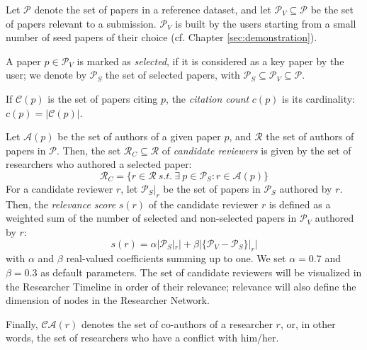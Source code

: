 Let $\mathcal{P}$ denote the set of papers in a reference dataset, %
and let $\mathcal{P}_{V} \subseteq \mathcal{P}$ be the set of papers relevant to a submission. %
$\mathcal{P}_{V}$ is built by the users starting from a small number of seed papers of their choice (cf. Chapter \ref{sec:demonstration}).%

A paper $p \in \mathcal{P}_{V}$ is marked as \emph{selected}, if it is considered as a key paper by the user; we denote by $\mathcal{P}_{S}$ the set of selected papers, with $\mathcal{P}_{S} \subseteq \mathcal{P}_{V} \subseteq \mathcal{P}$. 

If $\mathcal{C}(p)$ is the set of papers citing $p$, the \emph{citation count} $c(p)$ is its cardinality: $c(p) = \vert \mathcal{C}(p) \vert$.

Let $\mathcal{A}(p)$ be the set of authors of a given paper $p$, and $\mathcal{R}$ the set of authors of papers in $\mathcal{P}$. 
Then, the set $\mathcal{R}_C \subseteq \mathcal{R}$ of \emph{candidate reviewers} is given by the set of researchers who authored a selected paper: $$\mathcal{R}_{C} = \{r \in \mathcal{R} \ s.t. \ \exists \ p \in \mathcal{P}_S : r \in \mathcal{A}(p)\}$$ %
%
For a candidate reviewer $r$, let $\mathcal{P}_{S}|_{r}$ be the set of papers in $\mathcal{P}_{S}$ authored by $r$. Then, the \emph{relevance score} $s(r)$ of the candidate reviewer $r$ is defined as a weighted sum of the number of selected and non-selected papers in $\mathcal{P}_V$ authored by $r$: $$s(r) = \alpha \vert \mathcal{P}_{S}|_{r} \vert + \beta \vert \{\mathcal{P}_{V} - \mathcal{P}_{S}\}|_{r}\vert$$ with $\alpha$ and $\beta$ real-valued coefficients summing up to one. We set $\alpha = 0.7$ and $\beta = 0.3$ as default parameters. The set of candidate reviewers will be visualized in the Researcher Timeline in order of their relevance; relevance will also define the dimension of nodes in the Researcher Network.

Finally, $\mathcal{CA}(r)$ denotes the set of co-authors of a researcher $r$, or, in other words, the set of researchers who have a conflict with him/her. 